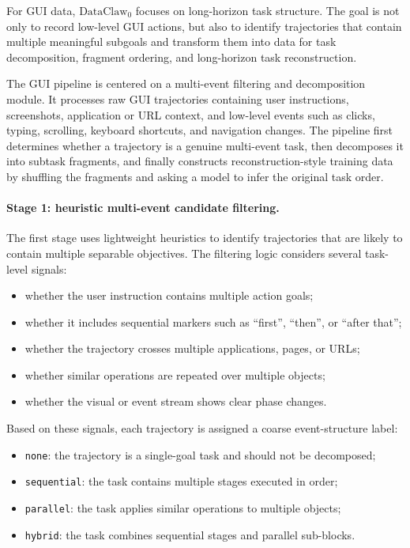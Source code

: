 \documentclass{llmxive}
\begin{document}
For GUI data, $\text{DataClaw}_0$ focuses on long-horizon task structure. The goal is not only to record low-level GUI actions, but also to identify trajectories that contain multiple meaningful subgoals and transform them into data for task decomposition, fragment ordering, and long-horizon task reconstruction.

The GUI pipeline is centered on a multi-event filtering and decomposition module. It processes raw GUI trajectories containing user instructions, screenshots, application or URL context, and low-level events such as clicks, typing, scrolling, keyboard shortcuts, and navigation changes. The pipeline first determines whether a trajectory is a genuine multi-event task, then decomposes it into subtask fragments, and finally constructs reconstruction-style training data by shuffling the fragments and asking a model to infer the original task order.

\paragraph{Stage 1: heuristic multi-event candidate filtering.}
The first stage uses lightweight heuristics to identify trajectories that are likely to contain multiple separable objectives. The filtering logic considers several task-level signals:
\begin{itemize}
    \item whether the user instruction contains multiple action goals;
    \item whether it includes sequential markers such as ``first'', ``then'', or ``after that'';
    \item whether the trajectory crosses multiple applications, pages, or URLs;
    \item whether similar operations are repeated over multiple objects;
    \item whether the visual or event stream shows clear phase changes.
\end{itemize}

Based on these signals, each trajectory is assigned a coarse event-structure label:
\begin{itemize}
    \item \texttt{none}: the trajectory is a single-goal task and should not be decomposed;
    \item \texttt{sequential}: the task contains multiple stages executed in order;
    \item \texttt{parallel}: the task applies similar operations to multiple objects;
    \item \texttt{hybrid}: the task combines sequential stages and parallel sub-blocks.
\end{itemize}
\end{document}
